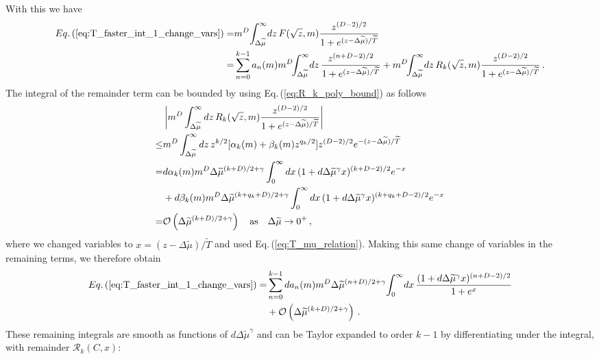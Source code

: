\documentclass[sn-mathphys,Numbered]{sn-jnl}
\newcommand{\req}[1]{Eq.\,(\ref{#1})}
\begin{document}
With this we have
\begin{align}
\req{eq:T_faster_int_1_change_vars} =&m^{D}\!\int_{\Delta\widetilde{\mu}}^\infty \!dz\, F(\sqrt{z},m) \frac{z^{(D-2)/2}}{1+e^{(z-\Delta\widetilde{\mu})/\widetilde{T}}} \\
=& \sum_{n=0}^{k-1} a_n(m)m^{D}\!\!\int_{\Delta\widetilde{\mu}}^\infty \!dz\, \frac{z^{(n+D-2)/2}}{1+e^{(z-\Delta\widetilde{\mu})/\widetilde{T}}}+m^{D}\!\!\int_{\Delta\widetilde{\mu}}^\infty\! dz\,R_k(\sqrt{z},m)\frac{z^{(D-2)/2}}{1+e^{(z-\Delta\widetilde{\mu})/\widetilde{T}}}\,.\notag
\end{align}
The integral of the remainder term can be bounded by using \req{eq:R_k_poly_bound} as follows
\begin{align}
 &\left|m^{D}\int_{\Delta\widetilde{\mu}}^\infty dz\,R_k(\sqrt{z},m)\frac{z^{(D-2)/2}}{1+e^{(z-\Delta\widetilde{\mu})/\widetilde{T}}}\right|\\
 \leq&m^{D}\int_{\Delta\widetilde{\mu}}^\infty dz\,z^{k/2}[\alpha_k(m)+\beta_k(m)z^{q_k/2}]z^{(D-2)/2}e^{-(z-\Delta\widetilde{\mu})/\widetilde{T}}\notag\\
=&d\alpha_k(m)m^{D}\Delta\widetilde{\mu}^{(k+D)/2+\gamma}\int_{0}^\infty dx\,(1+d\Delta\widetilde{\mu}^{\gamma}x)^{(k+D-2)/2}e^{-x}\notag\\
&+d\beta_k(m)m^{D}\Delta\widetilde{\mu}^{(k+q_k+D)/2+\gamma}\int_{0}^\infty dx\,(1+d\Delta\widetilde{\mu}^{\gamma}x)^{(k+q_k+D-2)/2}e^{-x}\notag\\ 
=&\mathcal{O}\left(\Delta\widetilde{\mu}^{(k+D)/2+\gamma}\right)\quad \text{as}\quad\Delta\widetilde{\mu}\to 0^+\,,\label{eq:T_faster_remainder_bound}
\end{align}
where we changed variables to $x=(z-\Delta\widetilde{\mu})/\widetilde{T}$ and used \req{eq:T_mu_relation}. Making this same change of variables in the remaining terms, we therefore obtain
\begin{align}\label{eq:T_faster_int_1_change_vars_expanded1}
\req{eq:T_faster_int_1_change_vars} =& \sum_{n=0}^{k-1} da_n(m)m^{D}\Delta\widetilde{\mu}^{(n+D)/2+\gamma}\!\int_{0}^\infty\! dx\, \frac{(1+d\Delta\widetilde{\mu}^{\gamma}x)^{(n+D-2)/2}}{1+e^{x}}\\
&+\mathcal{O}\left(\Delta\widetilde{\mu}^{(k+D)/2+\gamma}\right)\,.\notag
\end{align}
These remaining integrals are smooth as functions of $d\Delta\widetilde{\mu}^\gamma$ and can be Taylor expanded to order $k-1$ by differentiating under the integral, with remainder $\mathcal{R}_k(C,x)$:
\end{document}
